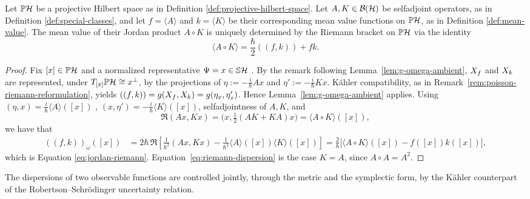 \begin{proposition}
	\label{prop:symmetric-bracket-intrinsic}
	Let $\PH$ be a projective Hilbert space as in Definition \ref{def:projective-hilbert-space}. Let $A,K\in\BH$ be selfadjoint operators, as in Definition \ref{def:special-classes}, and let $f = \langle A\rangle$ and $k = \langle K\rangle$ be their corresponding mean value functions on $\PH$, as in Definition \ref{def:mean-value}. The mean value of their Jordan product $A \circ K$ is uniquely determined by the Riemann bracket on $\PH$ via the identity
	\begin{equation}
		\langle A \circ K \rangle = \frac{\hbar}{2}((f,k)) +fk. \label{eq:jordan-riemann}
	\end{equation}
\end{proposition}
\begin{proof}
	Fix $[x]\in\PH$ and a normalized representative $\Psi=x \in \mathbb{S} \H$ . By the remark following Lemma~\ref{lem:g-omega-ambient}, $X_{f}$ and $X_{k}$ are
	represented, under $T_{[x]}\PH\cong x^\perp$, by the projections of
	$\eta:=-\frac i\hbar Ax$ and $\eta':=-\frac i\hbar Kx$. Kähler
	compatibility, as in Remark~\ref{rem:poisson-riemann-reformulation}, yields
	$((f,k))=g(X_{f},X_{k})=g(\eta_x,\eta'_x)$. Hence
	Lemma~\ref{lem:g-omega-ambient} applies. Using $(\eta,x)=\frac i\hbar\langle A\rangle([x])$ , $(x,\eta')=-\frac i\hbar\langle K\rangle([x])$, 
	selfadjointness of $A,K$, and $$\Re(Ax,Kx)=\big(x,\tfrac12(AK+KA)x\big)
	=\langle A\circ K\rangle([x]),$$
	we have that
	\begin{align*}
		((f,k))_\omega([x]) &= 2\hbar\,\Re\left[\frac1{\hbar^2}(Ax,Kx)-\frac{1}{\hbar^2}\langle A\rangle([x])\langle K\rangle([x])\right]
		=\frac2\hbar\big[\langle A\circ K\rangle([x])-f([x])k([x])\big],
	\end{align*}
	which is Equation \eqref{eq:jordan-riemann}. Equation~\eqref{eq:riemann-dispersion}
	is the case $K=A$, since $A\circ A=A^2$.
\end{proof}

\noindent The dispersions of two observable functions are controlled jointly, through the metric and the symplectic form, by the Kähler counterpart of the Robertson--Schrödinger uncertainty relation.
 

